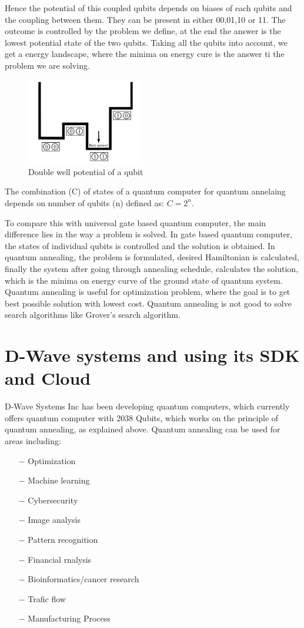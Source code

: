 \documentclass[12pt,conference]{IEEEtran}
\begin{document}
Hence the potential of this coupled qubits depends on biases of each qubits and the coupling between them. They can be present in either 00,01,10 or 11. The outcome is controlled by the problem we define, at the end the answer is the lowest potential state of the two qubits. Taking all the qubits into account, we get a energy landscape, where the minima on energy cure is the answer ti the problem we are solving. 

\begin{figure}[h]
  \centering
  \includegraphics[width=5cm]{entangled_low.png}
  \caption{Double well potential of a qubit}
  \label{fig:ELQbit}
\end{figure}

The combination (C) of states of a quantum computer for quantum annelaing depends on number of qubits (n) defined as: $ C = 2^n$.

To compare this with universal gate based quantum computer, the main difference lies in the way a problem is solved. In gate based quantum computer, the states of individual qubits is controlled and the solution is obtained. In quantum annealing, the problem is formulated, desired Hamiltonian is calculated, finally the system after going through annealing schedule, calculates the solution, which is the minima on energy curve of the ground state of quantum system. Quantum annealing is useful for optimization problem, where the goal is to get best possible solution with lowest cost. Quantum annealing is not good to solve search algorithms like Grover's search algorithm. 

\section{D-Wave systems and using its SDK and Cloud}
D-Wave Systems Inc has been developing quantum computers, which currently offers quantum computer with 2038 Qubits, which works on the principle of quantum annealing, as explained above. Quantum annealing can be used for areas including:\cite{3}
\begin{itemize}
  \item[$-$] Optimization 
  \item[$-$] Machine learning
  \item[$-$] Cybersecurity
  \item[$-$] Image analysis
  \item[$-$] Pattern recognition
  \item[$-$] Financial rnalysis
  \item[$-$] Bioinformatics/cancer research
  \item[$-$] Trafic flow 
  \item[$-$] Manufacturing Process
\end{itemize}
\end{document}
